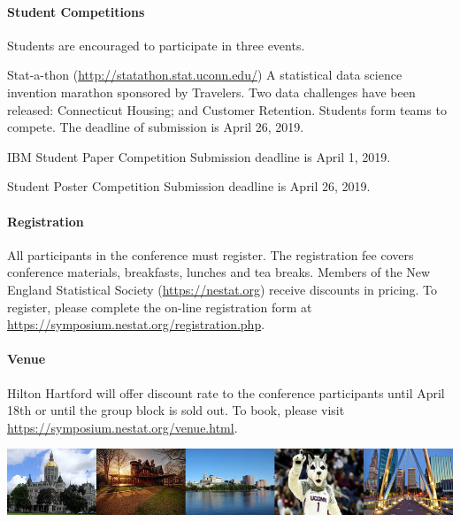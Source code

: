 \documentclass[12pt]{article}
\begin{document}
\paragraph{Student Competitions} Students are encouraged to participate in three events.

\textsf{Stat-a-thon} (\url{http://statathon.stat.uconn.edu/})
A statistical data science invention marathon sponsored by Travelers. Two data challenges have been released: Connecticut Housing; and Customer Retention. Students form teams to compete. The deadline of submission is April 26, 2019.

\textsf{IBM Student Paper Competition} Submission deadline is April 1, 2019.

\textsf{Student Poster Competition} Submission deadline is April 26, 2019.


\paragraph{Registration}
All participants in the conference must register. The registration fee
covers conference materials, breakfasts, lunches and tea
breaks. Members of the New England Statistical Society
(\url{https://nestat.org}) receive discounts in pricing. To register,
please complete the on-line registration form at
\url{https://symposium.nestat.org/registration.php}.


\paragraph{Venue}
Hilton Hartford will offer discount rate to the conference
participants until April 18th or until the group block is sold out. To
book, please visit
\url{https://symposium.nestat.org/venue.html}.


\vfill

\begin{center}
\includegraphics[width=\textwidth]{hartford-banner}
\end{center}
\end{document}
